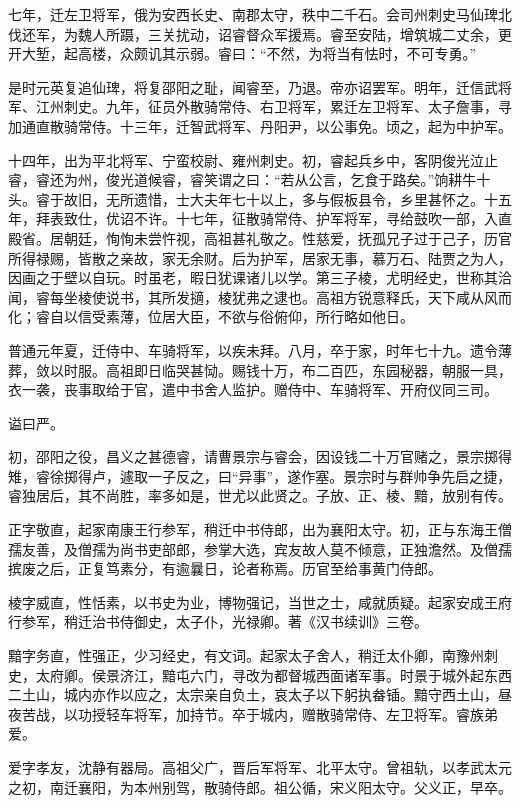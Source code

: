 \documentclass[12pt,UTF8]{ctexbook}
\begin{document}
七年，迁左卫将军，俄为安西长史、南郡太守，秩中二千石。会司州刺史马仙琕北伐还军，为魏人所蹑，三关扰动，诏睿督众军援焉。睿至安陆，增筑城二丈余，更开大堑，起高楼，众颇讥其示弱。睿曰：“不然，为将当有怯时，不可专勇。”

是时元英复追仙琕，将复邵阳之耻，闻睿至，乃退。帝亦诏罢军。明年，迁信武将军、江州刺史。九年，征员外散骑常侍、右卫将军，累迁左卫将军、太子詹事，寻加通直散骑常侍。十三年，迁智武将军、丹阳尹，以公事免。顷之，起为中护军。

十四年，出为平北将军、宁蛮校尉、雍州刺史。初，睿起兵乡中，客阴俊光泣止睿，睿还为州，俊光道候睿，睿笑谓之曰：“若从公言，乞食于路矣。”饷耕牛十头。睿于故旧，无所遗惜，士大夫年七十以上，多与假板县令，乡里甚怀之。十五年，拜表致仕，优诏不许。十七年，征散骑常侍、护军将军，寻给鼓吹一部，入直殿省。居朝廷，恂恂未尝忤视，高祖甚礼敬之。性慈爱，抚孤兄子过于己子，历官所得禄赐，皆散之亲故，家无余财。后为护军，居家无事，慕万石、陆贾之为人，因画之于壁以自玩。时虽老，暇日犹课诸儿以学。第三子棱，尤明经史，世称其洽闻，睿每坐棱使说书，其所发擿，棱犹弗之逮也。高祖方锐意释氏，天下咸从风而化；睿自以信受素薄，位居大臣，不欲与俗俯仰，所行略如他日。

普通元年夏，迁侍中、车骑将军，以疾未拜。八月，卒于家，时年七十九。遗令薄葬，敛以时服。高祖即日临哭甚恸。赐钱十万，布二百匹，东园秘器，朝服一具，衣一袭，丧事取给于官，遣中书舍人监护。赠侍中、车骑将军、开府仪同三司。

谥曰严。

初，邵阳之役，昌义之甚德睿，请曹景宗与睿会，因设钱二十万官赌之，景宗掷得雉，睿徐掷得卢，遽取一子反之，曰“异事”，遂作塞。景宗时与群帅争先启之捷，睿独居后，其不尚胜，率多如是，世尤以此贤之。子放、正、棱、黯，放别有传。

正字敬直，起家南康王行参军，稍迁中书侍郎，出为襄阳太守。初，正与东海王僧孺友善，及僧孺为尚书吏部郎，参掌大选，宾友故人莫不倾意，正独澹然。及僧孺摈废之后，正复笃素分，有逾曩日，论者称焉。历官至给事黄门侍郎。

棱字威直，性恬素，以书史为业，博物强记，当世之士，咸就质疑。起家安成王府行参军，稍迁治书侍御史，太子仆，光禄卿。著《汉书续训》三卷。

黯字务直，性强正，少习经史，有文词。起家太子舍人，稍迁太仆卿，南豫州刺史，太府卿。侯景济江，黯屯六门，寻改为都督城西面诸军事。时景于城外起东西二土山，城内亦作以应之，太宗亲自负土，哀太子以下躬执畚锸。黯守西土山，昼夜苦战，以功授轻车将军，加持节。卒于城内，赠散骑常侍、左卫将军。睿族弟爱。

爱字孝友，沈静有器局。高祖父广，晋后军将军、北平太守。曾祖轨，以孝武太元之初，南迁襄阳，为本州别驾，散骑侍郎。祖公循，宋义阳太守。父义正，早卒。
\end{document}
